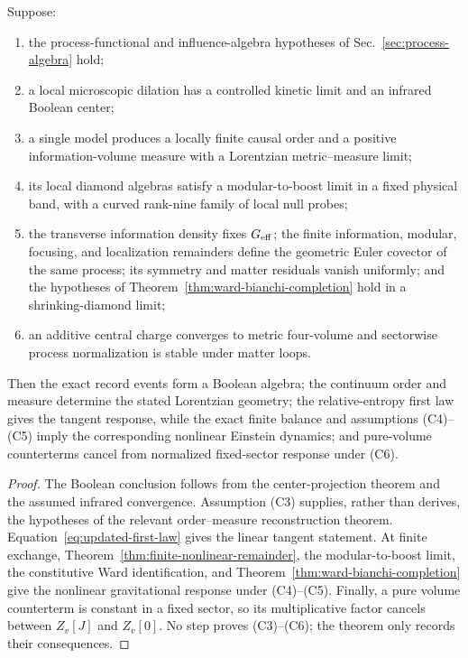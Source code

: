 \begin{theorem}
\label{thm:updated-conditional-synthesis}
Suppose:
\begin{enumerate}[label=(C\arabic*)]
\item the process-functional and influence-algebra hypotheses of
Sec.~\ref{sec:process-algebra} hold;
\item a local microscopic dilation has a controlled kinetic limit and an
infrared Boolean center;
\item a single model produces a locally finite causal order and a positive
information-volume measure with a Lorentzian metric--measure limit;
\item its local diamond algebras satisfy a modular-to-boost limit in a fixed
physical band, with a curved rank-nine family of local null probes;
\item the transverse information density fixes \(G_{\rm eff}\); the finite
information, modular, focusing, and localization remainders define the
geometric Euler covector of the same process; its symmetry and matter
residuals vanish uniformly; and the hypotheses of
Theorem~\ref{thm:ward-bianchi-completion} hold in a shrinking-diamond limit;
\item an additive central charge converges to metric four-volume and
sectorwise process normalization is stable under matter loops.
\end{enumerate}
Then the exact record events form a Boolean algebra; the continuum order and
measure determine the stated Lorentzian geometry; the relative-entropy first
law gives the tangent response, while the exact finite balance and
assumptions (C4)--(C5) imply the corresponding nonlinear Einstein dynamics;
and pure-volume counterterms cancel from normalized
fixed-sector response under (C6).
\end{theorem}

\begin{proof}
The Boolean conclusion follows from the center-projection theorem and the
assumed infrared convergence.  Assumption (C3) supplies, rather than derives,
the hypotheses of the relevant order--measure reconstruction theorem.
Equation~\eqref{eq:updated-first-law} gives the linear tangent statement.
At finite exchange, Theorem~\ref{thm:finite-nonlinear-remainder}, the
modular-to-boost limit, the constitutive Ward identification, and
Theorem~\ref{thm:ward-bianchi-completion} give the nonlinear gravitational
response under (C4)--(C5).  Finally, a pure volume counterterm
is constant in a fixed sector, so its multiplicative factor cancels between
\(Z_v[J]\) and \(Z_v[0]\).
No step proves (C3)--(C6); the theorem only records their consequences.
\end{proof}

